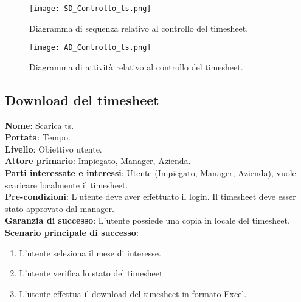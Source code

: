 \begin{figure}[H]
    \vspace{2cm}
	\centering
	\texttt{[image: SD\_Controllo\_ts.png]}
	\caption{Diagramma di sequenza relativo al controllo del timesheet.}
	\label{fig:sd_controllots}
\end{figure}

\begin{figure}[H]
	\centering
	\texttt{[image: AD\_Controllo\_ts.png]}
	\caption{Diagramma di attività relativo al controllo del timesheet.}
	\label{fig:ad_controllots}
\end{figure}

\subsection{Download del timesheet}
\textbf{Nome}: Scarica ts.\\
\textbf{Portata}: Tempo.\\
\textbf{Livello}: Obiettivo utente.\\
\textbf{Attore primario}: Impiegato, Manager, Azienda.\\
\textbf{Parti interessate e interessi}: Utente (Impiegato, Manager, Azienda), vuole scaricare localmente il timesheet.\\
\textbf{Pre-condizioni}: L’utente deve aver effettuato il login. Il timesheet deve esser stato approvato dal manager.\\
\textbf{Garanzia di successo}: L’utente possiede una copia in locale del timesheet.\\
\textbf{Scenario principale di successo}: 
\begin{enumerate}
    \item L’utente seleziona il mese di interesse.
    \item L'utente verifica lo stato del timesheet.
    \item L'utente effettua il download del timesheet in formato Excel.
\end{enumerate}

